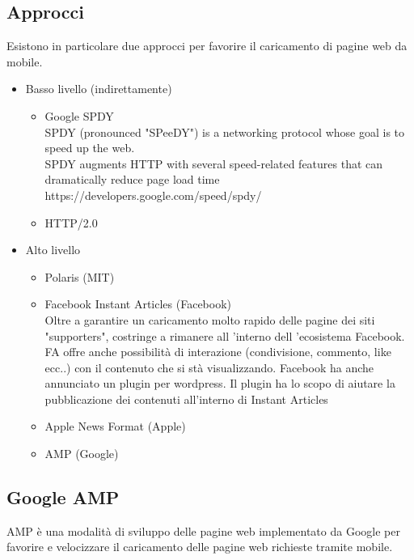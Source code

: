 \documentclass{article}
\begin{document}
\subsection{Approcci}
Esistono in particolare due approcci per favorire il caricamento di pagine web da mobile.
\begin{itemize}
    \item Basso livello (indirettamente)
    \begin{itemize}
        \item Google SPDY\\ 
        SPDY (pronounced "SPeeDY") is a networking protocol whose goal is to speed up the web.\\
        SPDY augments HTTP with several speed-related features that can dramatically reduce page load time\\
        https://developers.google.com/speed/spdy/
        \item HTTP/2.0
    \end{itemize}

    \item Alto livello
    \begin{itemize}
        \item Polaris (MIT)
        \item Facebook Instant Articles (Facebook)\\
        Oltre a garantire un caricamento molto rapido delle pagine dei siti "supporters", costringe a rimanere all ’interno dell ’ecosistema Facebook.
FA offre anche possibilità di interazione (condivisione, commento, like ecc..) con il contenuto che si stà visualizzando.
Facebook ha anche annunciato un plugin per wordpress. Il plugin ha lo scopo di aiutare la pubblicazione dei contenuti all’interno di Instant Articles

        \item Apple News Format (Apple)
        \item AMP (Google)
    \end{itemize}
\end{itemize}

\subsection{Google AMP}
AMP è una modalità di sviluppo delle pagine web implementato da Google per favorire e velocizzare il caricamento delle pagine web richieste tramite mobile.
\end{document}
